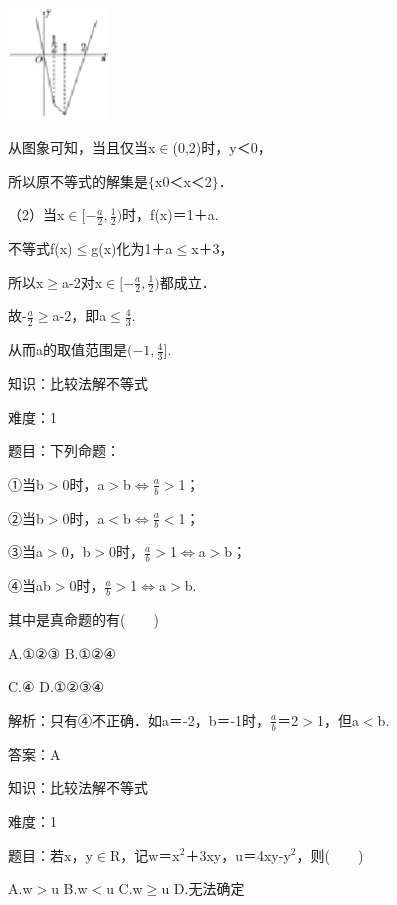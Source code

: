 \documentclass{article} %
\begin{document}
\includegraphics*[width=1.07in, height=1.16in, keepaspectratio=false]{image2}

从图象可知，当且仅当x$\mathrm{\in}$(0,2)时，y＜0，

所以原不等式的解集是$\mathrm{\{}$x{\textbar}0＜x＜2$\mathrm{\}}$．

（2）当x$\mathrm{\in}[-\frac{a}{2},\frac{1}{2})$时，f(x)＝1＋a.

不等式f(x)$\mathrm{\le}$g(x)化为1＋a$\mathrm{\le}$x＋3，

所以x$\mathrm{\ge}$a-2对x$\mathrm{\in}[-\frac{a}{2},\frac{1}{2})$都成立．

故-$\frac{a}{2}\mathrm{\ge}$a-2，即a$\mathrm{\le}\frac{4}{3}$.

从而a的取值范围是$(-1,\frac{4}{3}]$.



 知识：比较法解不等式

 难度：1

 题目：下列命题：

①当b$\mathrm{>}$0时，a$\mathrm{>}$b$\mathrm{\Leftrightarrow }$$\frac{a}{b}\mathrm{>}$1；

②当b$\mathrm{>}$0时，a$\mathrm{<}$b$\mathrm{\Leftrightarrow }$$\frac{a}{b}\mathrm{<}$1；

③当a$\mathrm{>}$0，b$\mathrm{>}$0时，$\frac{a}{b}\mathrm{>}$1$\mathrm{\Leftrightarrow }$a$\mathrm{>}$b；

④当ab$\mathrm{>}$0时，$\frac{a}{b}\mathrm{>}$1$\mathrm{\Leftrightarrow }$a$\mathrm{>}$b.

其中是真命题的有(　　)

A.①②③  B.①②④  

C.④          D.①②③④

解析：只有④不正确．如a＝-2，b＝-1时，$\frac{a}{b}$＝2$\mathrm{>}$1，但a$\mathrm{<}$b.

答案：A



 知识：比较法解不等式

 难度：1

 题目：若x，y$\mathrm{\in}$R，记w＝x${}^{2}$＋3xy，u＝4xy-y${}^{2}$，则(　　)

A.w$\mathrm{>}$u  B.w$\mathrm{<}$u  C.w$\mathrm{\ge}$u  D.无法确定
\end{document}
